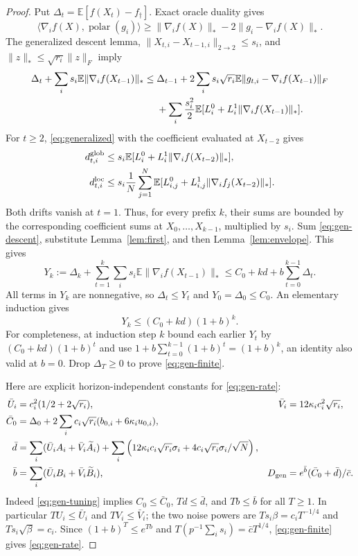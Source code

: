 \documentclass[11pt]{article}
\newcommand{\E}{\mathbb E}
\newcommand{\op}[1]{\lVert #1\rVert_{2\to2}}
\newcommand{\nuc}[1]{\lVert #1\rVert_*}
\newcommand{\frob}[1]{\lVert #1\rVert_F}
\newcommand{\ip}[2]{\langle #1,#2\rangle}
\newcommand{\avg}{\frac1N\sum_{j=1}^N}
\newcommand{\pol}{\operatorname{polar}}
\newcommand{\barc}{\bar c}
\begin{document}
\begin{proof}
Put $\Delta_t=\E[f(X_t)-f_\dagger]$. Exact oracle duality gives
\[
 \ip{\nabla_i f(X)}{\pol(g_i)}
 \ge\nuc{\nabla_i f(X)}-2\nuc{g_i-\nabla_i f(X)}.
\]
The generalized descent lemma, $\op{X_{t,i}-X_{t-1,i}}\le s_i$, and
$\nuc z\le\sqrt{r_i}\frob z$ imply
\begin{align}\label{eq:gen-descent}
 \Delta_t+\sum_is_i\E\nuc{\nabla_i f(X_{t-1})}
 \le{}&\Delta_{t-1}
   +2\sum_i s_i\sqrt{r_i}\E\frob{g_{t,i}-\nabla_i f(X_{t-1})}\notag\\
   &+\sum_i\frac{s_i^2}2\E
          [L_i^0+L_i^1\nuc{\nabla_i f(X_{t-1})}].
\end{align}
For $t\ge2$, \eqref{eq:generalized} with the coefficient evaluated at
$X_{t-2}$ gives
\begin{align*}
 d_{t,i}^{\rm glob}&\le s_i\E
       [L_i^0+L_i^1\nuc{\nabla_i f(X_{t-2})}],\\
 d_{t,i}^{\rm loc}&\le s_i\avg\E
       [L_{i,j}^0+L_{i,j}^1\nuc{\nabla_i f_j(X_{t-2})}].
\end{align*}
Both drifts vanish at $t=1$. Thus, for every prefix $k$, their sums are
bounded by the corresponding coefficient sums at $X_0,\ldots,X_{k-1}$,
multiplied by $s_i$. Sum \eqref{eq:gen-descent}, substitute
Lemma~\ref{lem:first}, and then Lemma~\ref{lem:envelope}. This gives
\begin{equation}\label{eq:prefix}
 Y_k:=\Delta_k+\sum_{t=1}^k\sum_is_i\E\nuc{\nabla_i f(X_{t-1})}
 \le C_0+kd+b\sum_{t=0}^{k-1}\Delta_t.
\end{equation}
All terms in $Y_k$ are nonnegative, so $\Delta_t\le Y_t$ and
$Y_0=\Delta_0\le C_0$. An elementary induction gives
\[
 Y_k\le(C_0+kd)(1+b)^k.
\]
For completeness, at induction step $k$ bound each earlier $Y_t$ by
$(C_0+kd)(1+b)^t$ and use
$1+b\sum_{t=0}^{k-1}(1+b)^t=(1+b)^k$, an identity also valid at $b=0$.
Drop $\Delta_T\ge0$ to prove \eqref{eq:gen-finite}.

Here are explicit horizon-independent constants for \eqref{eq:gen-rate}:
\begin{align*}
 \bar U_i&=c_i^2(1/2+2\sqrt{r_i}),
 &\bar V_i&=12\kappa_i c_i^2\sqrt{r_i},\\
 \bar C_0&=\Delta_0+2\sum_ic_i\sqrt{r_i}
                    (b_{0,i}+6\kappa_i u_{0,i}),\\
 \bar d&=\sum_i(\bar U_iA_i+\bar V_i\widetilde A_i)
       +\sum_i\left(12\kappa_ic_i\sqrt{r_i}\sigma_i
                    +4c_i\sqrt{r_i}\sigma_i/\sqrt N\right),\\
 \bar b&=\sum_i(\bar U_iB_i+\bar V_i\widetilde B_i),
 &D_{\rm gen}&=e^{\bar b}(\bar C_0+\bar d)/\barc.
\end{align*}
Indeed \eqref{eq:gen-tuning} implies
$C_0\le\bar C_0$, $Td\le\bar d$, and $Tb\le\bar b$ for all $T\ge1$.
In particular $TU_i\le\bar U_i$ and $TV_i\le\bar V_i$;
the two noise powers are $Ts_i\beta=c_iT^{-1/4}$ and
$Ts_i\sqrt\beta=c_i$. Since $(1+b)^T\le e^{Tb}$ and
$T(p^{-1}\sum_i s_i)=\barc T^{1/4}$,
\eqref{eq:gen-finite} gives \eqref{eq:gen-rate}.
\end{proof}
\end{document}
